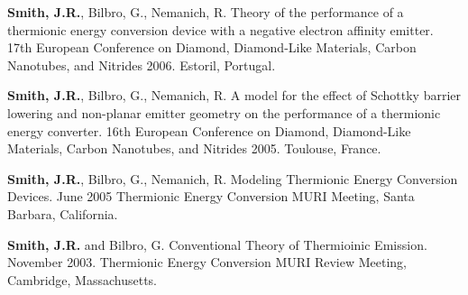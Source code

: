\textbf{Smith, J.R.}, Bilbro, G., Nemanich, R. Theory of the performance
of a thermionic energy conversion device with a negative electron
affinity emitter. 17th European Conference on Diamond, Diamond-Like
Materials, Carbon Nanotubes, and Nitrides 2006. Estoril, Portugal.

\textbf{Smith, J.R.}, Bilbro, G., Nemanich, R. A model for the effect of
Schottky barrier lowering and non-planar emitter geometry on the
performance of a thermionic energy converter. 16th European Conference
on Diamond, Diamond-Like Materials, Carbon Nanotubes, and Nitrides 2005.
Toulouse, France.

\textbf{Smith, J.R.}, Bilbro, G., Nemanich, R. Modeling Thermionic
Energy Conversion Devices. June 2005 Thermionic Energy Conversion MURI
Meeting, Santa Barbara, California.

\textbf{Smith, J.R.} and Bilbro, G. Conventional Theory of Thermioinic
Emission. November 2003. Thermionic Energy Conversion MURI Review
Meeting, Cambridge, Massachusetts.
